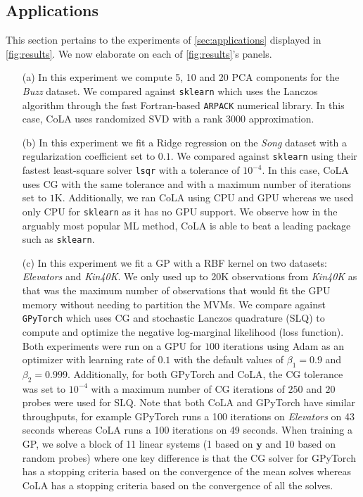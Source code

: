 \documentclass{article}
\newcommand{\mbf}[1]{{\boldsymbol{\mathbf{#1}}}}
\renewcommand{\bm}{\mbf}
\begin{document}
\subsection{Applications} \label{app:app-exps}
This section pertains to the experiments of \autoref{sec:applications}
displayed in \autoref{fig:results}.
We now elaborate on each of \autoref{fig:results}'s panels.

\begin{enumerate}
    \item[(a)]
    In this experiment we compute 5, 10 and 20 PCA components for the
    \emph{Buzz} dataset.
    We compared against \texttt{sklearn} which uses the Lanczos algorithm through the fast Fortran-based \texttt{ARPACK} numerical library.
    In this case, CoLA uses randomized SVD \citep{martinsson2020rnla}
    with a rank $3000$ approximation.

    \item[(b)]
    In this experiment we fit a Ridge regression on the
    \emph{Song} dataset with a regularization coefficient set to $0.1$.
    We compared against \texttt{sklearn} using their fastest least-square solver
    \texttt{lsqr} with a tolerance of $10^{-4}$.
    In this case, CoLA uses CG with the same tolerance and with a maximum number of iterations
    set to $1$K. Additionally, we ran CoLA using CPU and GPU whereas we used only CPU for
    \texttt{sklearn} as it has no GPU support.
    We observe how in the arguably most popular ML method, CoLA is able to beat
    a leading package such as \texttt{sklearn}.

    \item[(c)]
    In this experiment we fit a GP with a RBF kernel on two datasets:
    \emph{Elevators} and \emph{Kin40K}.
    We only used up to 20K observations from \emph{Kin40K} as that was the maximum number of
    observations that would fit the GPU memory without needing to partition the MVMs.
    We compare against \texttt{GPyTorch} which uses CG and stochastic Lanczos quadrature (SLQ)
    to compute and optimize the negative log-marginal likelihood (loss function).
    Both experiments were run on a GPU for $100$ iterations
    using Adam as an optimizer with learning rate of
    $0.1$ with the default values of $\beta_1 = 0.9$ and $\beta_2=0.999$.
    Additionally, for both GPyTorch and CoLA, the CG tolerance was set to $10^{-4}$ with a maximum number of CG iterations of $250$ and $20$ probes were used for SLQ.
    Note that both CoLA and GPyTorch have similar throughputs, for example
    GPyTorch runs a 100 iterations on \emph{Elevators} on 43 seconds whereas
    CoLA runs a 100 iterations on 49 seconds.
    When training a GP, we solve a block of 11 linear systems (1 based on $\bm{y}$ and 10
    based on random probes) where
    one key difference is that the CG solver for GPyTorch has a stopping criteria
    based on the convergence of the mean solves whereas CoLA has a stopping criteria
    based on the convergence of all the solves.


\end{enumerate}
\end{document}
